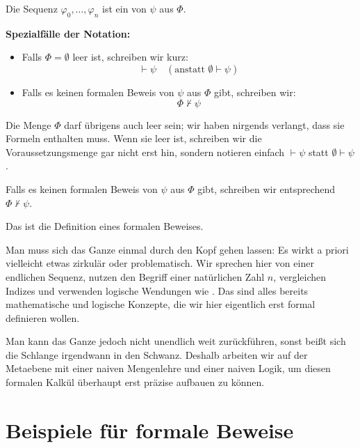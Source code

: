\begin{math-stroke}
Die Sequenz $\varphi_0, \dots, \varphi_n$ ist ein  von $\psi$ aus $\Phi$.

\textbf{Spezialfälle der Notation:}
\begin{itemize}
    \item Falls $\Phi = \emptyset$ leer ist, schreiben wir kurz:
    \begin{equation}\label{eq:beweis-leer}
    \vdash \psi \quad (\text{anstatt } \emptyset \vdash \psi)
    \end{equation}
    \item Falls es keinen formalen Beweis von $\psi$ aus $\Phi$ gibt, schreiben wir:
    \begin{equation}\label{eq:nicht-beweisbar}
    \Phi \not\vdash \psi
    \end{equation}
\end{itemize}
\end{math-stroke}

\begin{spoken-clean}[00:28:22 - 00:30:00]
Die Menge $\Phi$ darf übrigens auch leer sein; wir haben nirgends verlangt, dass sie Formeln enthalten muss. Wenn sie leer ist, schreiben wir die Voraussetzungsmenge gar nicht erst hin, sondern notieren einfach $\vdash \psi$ statt $\emptyset \vdash \psi$. 

Falls es keinen formalen Beweis von $\psi$ aus $\Phi$ gibt, schreiben wir entsprechend $\Phi \not\vdash \psi$. 

Das ist die Definition eines formalen Beweises. 

Man muss sich das Ganze einmal durch den Kopf gehen lassen: Es wirkt a priori vielleicht etwas zirkulär oder problematisch. Wir sprechen hier von einer endlichen Sequenz, nutzen den Begriff einer natürlichen Zahl $n$, vergleichen Indizes und verwenden logische Wendungen wie . Das sind alles bereits mathematische und logische Konzepte, die wir hier eigentlich erst formal definieren wollen. 

Man kann das Ganze jedoch nicht unendlich weit zurückführen, sonst beißt sich die Schlange irgendwann in den Schwanz. Deshalb arbeiten wir auf der Metaebene mit einer naiven Mengenlehre und einer naiven Logik, um diesen formalen Kalkül überhaupt erst präzise aufbauen zu können.
\end{spoken-clean}

\section{Beispiele für formale Beweise}

